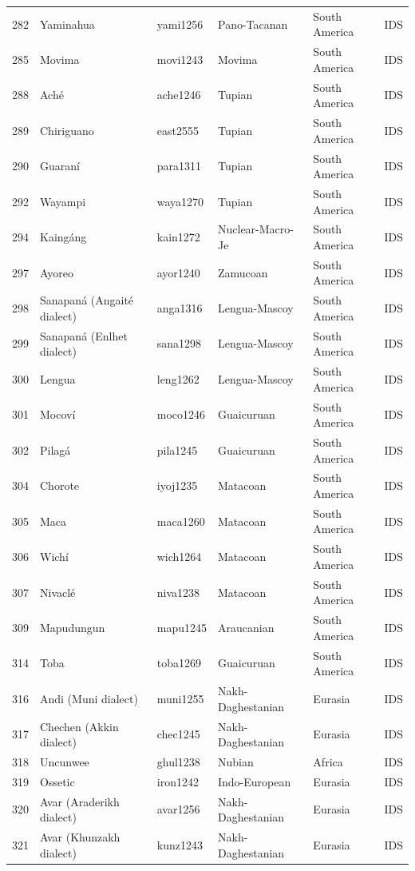 \begin{table}[ht]
\begin{tabular}{rlllll}
  282 & Yaminahua & yami1256 & Pano-Tacanan & South America & IDS \\ 
  285 & Movima & movi1243 & Movima & South America & IDS \\ 
  288 & Aché & ache1246 & Tupian & South America & IDS \\ 
  289 & Chiriguano & east2555 & Tupian & South America & IDS \\ 
  290 & Guaraní & para1311 & Tupian & South America & IDS \\ 
  292 & Wayampi & waya1270 & Tupian & South America & IDS \\ 
  294 & Kaingáng & kain1272 & Nuclear-Macro-Je & South America & IDS \\ 
  297 & Ayoreo & ayor1240 & Zamucoan & South America & IDS \\ 
  298 & Sanapaná (Angaité dialect) & anga1316 & Lengua-Mascoy & South America & IDS \\ 
  299 & Sanapaná (Enlhet dialect) & sana1298 & Lengua-Mascoy & South America & IDS \\ 
  300 & Lengua & leng1262 & Lengua-Mascoy & South America & IDS \\ 
  301 & Mocoví & moco1246 & Guaicuruan & South America & IDS \\ 
  302 & Pilagá & pila1245 & Guaicuruan & South America & IDS \\ 
  304 & Chorote & iyoj1235 & Matacoan & South America & IDS \\ 
  305 & Maca & maca1260 & Matacoan & South America & IDS \\ 
  306 & Wichí & wich1264 & Matacoan & South America & IDS \\ 
  307 & Nivaclé & niva1238 & Matacoan & South America & IDS \\ 
  309 & Mapudungun & mapu1245 & Araucanian & South America & IDS \\ 
  314 & Toba & toba1269 & Guaicuruan & South America & IDS \\ 
  316 & Andi (Muni dialect) & muni1255 & Nakh-Daghestanian & Eurasia & IDS \\ 
  317 & Chechen (Akkin dialect) & chec1245 & Nakh-Daghestanian & Eurasia & IDS \\ 
  318 & Uncunwee & ghul1238 & Nubian & Africa & IDS \\ 
  319 & Ossetic & iron1242 & Indo-European & Eurasia & IDS \\ 
  320 & Avar (Araderikh dialect) & avar1256 & Nakh-Daghestanian & Eurasia & IDS \\ 
  321 & Avar (Khunzakh dialect) & kunz1243 & Nakh-Daghestanian & Eurasia & IDS \\ 

\end{tabular}
\end{table}
